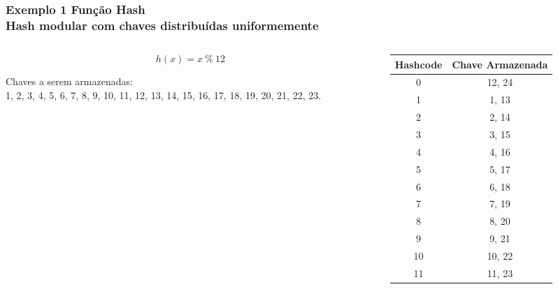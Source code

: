 \documentclass{beamer}
\begin{document}
\begin{frame}
  \frametitle{Exemplo 1 Função Hash\\\small{Hash modular com chaves distribuídas uniformemente}}

  \begin{columns}
    \begin{column}{.5\textwidth}
      \[ h(x) = x~\%~12 \]

      \center Chaves a serem armazenadas:\\1, 2, 3, 4, 5, 6, 7, 8, 9, 10, 11, 12, 13, 14, 15, 16, 17, 18, 19, 20, 21, 22, 23.
    \end{column}
    \begin{column}{.5\textwidth}

      \begin{table}[]
        \centering
        \small
        \begin{tabular}{@{}cc@{}}
          \toprule
          Hashcode & Chave Armazenada \\ \midrule
          0        & 12, 24           \\
          1        & 1, 13            \\
          2        & 2, 14            \\
          3        & 3, 15            \\
          4        & 4, 16            \\
          5        & 5, 17            \\
          6        & 6, 18            \\
          7        & 7, 19            \\
          8        & 8, 20            \\
          9        & 9, 21            \\
          10       & 10, 22           \\
          11       & 11, 23           \\ \bottomrule
        \end{tabular}
      \end{table}  
    \end{column}
  \end{columns}
\end{frame}
\end{document}
